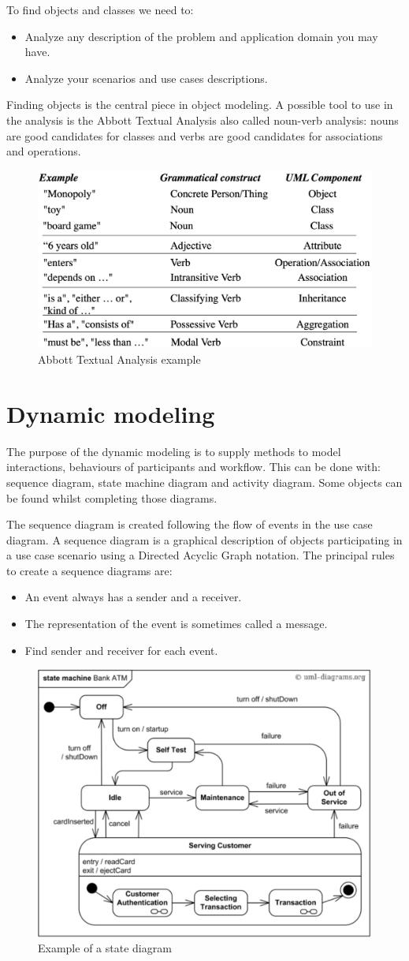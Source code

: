 \documentclass[12pt, a4paper]{report}
\newtheorem[style=M,bodystyle=\normalfont]{theorem}{Theorem}
\newtheorem[style=M,bodystyle=\normalfont]{corollary}{Corollary}
\newtheorem[style=M,bodystyle=\normalfont]{lemma}{Lemma}
\newtheorem[style=M,bodystyle=\normalfont]{definition}{Definition}
\begin{document}
    To find objects and classes we need to:
    \begin{itemize}
        \item Analyze any description of the problem and application domain you may have.
        \item Analyze your scenarios and use cases descriptions.
    \end{itemize}
    Finding objects is the central piece in object modeling. A possible tool to use in the analysis is the Abbott Textual Analysis also called noun-verb analysis: nouns are good 
    candidates for classes and verbs are good candidates for associations and operations. 
    \begin{figure}[H]
        \centering
        \includegraphics[width=0.5\linewidth]{images/Abbott.png}
        \caption{Abbott Textual Analysis example}
    \end{figure}
\section{Dynamic modeling}
    The purpose of the dynamic modeling is to supply methods to model interactions, behaviours of participants and workflow. This can be done with: sequence diagram, state machine 
    diagram and activity diagram. Some objects can be found whilst completing those diagrams.
     
    The sequence diagram is created following the flow of events in the use case diagram. A sequence diagram is a graphical description of objects participating in a use case 
    scenario using a Directed Acyclic Graph notation.
    The principal rules to create a sequence diagrams are: 
    \begin{itemize}
        \item An event always has a sender and a receiver.
        \item The representation of the event is sometimes called a message.
        \item Find sender and receiver for each event.
    \end{itemize}
    \begin{figure}[H]
        \centering
        \includegraphics[width=0.5\linewidth]{images/state.png}
        \caption{Example of a state diagram}
    \end{figure}
     
\end{document}
